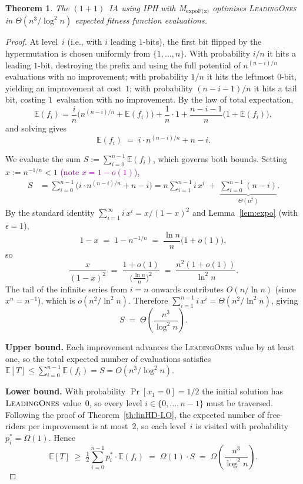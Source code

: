 \documentclass[lettersize,journal]{IEEEtran}
\newcommand{\rerev}[1]{\textcolor{purple}{#1}}
\newcommand{\EE}{\mathbb{E}}
\newcommand{\oneoneIA}{$(1+1)$~IA}
\newcommand{\expoF}{M$_{\text{expoF(x)}}$}
\newcommand{\IPHfcm}{IPH}
\newtheorem{theorem}{Theorem}
\begin{document}
\setcounter{theorem}{3}
\begin{theorem} %
The {\oneoneIA } using \IPHfcm{} with {\expoF } optimises
\textsc{LeadingOnes} in $\Theta(n^3/\log^2 n)$ expected fitness function
evaluations.
\end{theorem}

\begin{proof}
At level~$i$ (i.e., with $i$ leading $1$-bits), the first bit flipped by the
hypermutation is chosen uniformly from $\{1,\dots,n\}$.  With probability
$i/n$ it hits a leading $1$-bit, destroying the prefix and using the full
potential of $n^{(n-i)/n}$ evaluations with no improvement; with probability
$1/n$ it hits the leftmost $0$-bit, yielding an improvement at cost~$1$; with
probability $(n-i-1)/n$ it hits a tail bit, costing $1$~evaluation with no
improvement.  By the law of total expectation,
\[
\EE(f_i)
= \frac{i}{n}\bigl(n^{(n-i)/n}+\EE(f_i)\bigr)
  +\frac{1}{n}\cdot 1
  +\frac{n-i-1}{n}\bigl(1+\EE(f_i)\bigr),
\]
and solving gives
\begin{equation}\label{eq:Efi-expoF}
\EE(f_i) \;=\; i\cdot n^{(n-i)/n} + n - i.
\end{equation}

We evaluate the sum
$S := \sum_{i=0}^{n-1} \EE(f_i)$, which governs both bounds.
Setting $x:=n^{-1/n}<1$ \rerev{(note $x=1-o(1)$)},
\begin{align*}
S
&= \sum_{i=0}^{n-1}\bigl(i\cdot n^{(n-i)/n}+n-i\bigr)
 = n\sum_{i=1}^{n-1} i\,x^{i}
   \;+\;\underbrace{\sum_{i=0}^{n-1}(n-i)}_{\Theta(n^2)}.
\end{align*}
By the standard identity $\sum_{i=1}^{\infty} i\,x^i = x/(1-x)^2$
and Lemma~\ref{lem:expo} (with $\epsilon=1$),
\[
1-x \;=\; 1 - n^{-1/n}
    \;=\; \frac{\ln n}{n}\bigl(1+o(1)\bigr),
\]
so
\[
\frac{x}{(1-x)^2}
\;=\; \frac{1+o(1)}{\bigl(\frac{\ln n}{n}\bigr)^2}
\;=\; \frac{n^2(1+o(1))}{\ln^2 n}.
\]
The tail of the infinite series from $i=n$ onwards contributes
$O(n/\ln n)$ (since $x^n = n^{-1}$), which is $o(n^2/\ln^2 n)$.
Therefore $\sum_{i=1}^{n-1} i\,x^{i} = \Theta(n^2/\ln^2 n)$, giving
\begin{equation}\label{eq:S-expoF}
S \;=\; \Theta\!\left(\frac{n^3}{\log^2 n}\right).
\end{equation}

\textbf{Upper bound.}
Each improvement advances the \textsc{LeadingOnes} value by at least one,
so the total expected number of evaluations satisfies
$\EE[T] \le \sum_{i=0}^{n-1} \EE(f_i) = S = O(n^3/\log^2 n)$.

\textbf{Lower bound.}
With probability $\Pr[x_1=0]=1/2$ the initial solution has
$\textsc{LeadingOnes}$ value~$0$, so every level $i\in\{0,\dots,n-1\}$
must be traversed.  Following the proof of Theorem~\ref{th:linHD-LO},
the expected number of free-riders per improvement is at most~$2$,
so each level~$i$ is visited with probability $p_i^*=\Omega(1)$.
Hence
\[
\EE[T]
\;\ge\;
\tfrac{1}{2}\sum_{i=0}^{n-1} p_i^*\cdot \EE(f_i)
\;=\;
\Omega(1)\cdot S
\;=\;
\Omega\!\left(\frac{n^3}{\log^2 n}\right).
\]
\end{proof}
\end{document}
